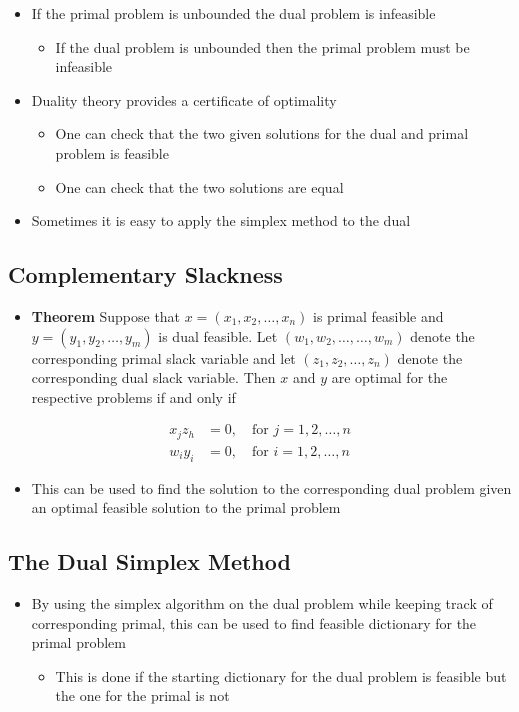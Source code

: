 \documentclass[11pt]{article}
\begin{document}
\begin{itemize}
\item If the primal problem is unbounded the dual problem is infeasible
\begin{itemize}
\item If the dual problem is unbounded then the primal problem must be infeasible
\end{itemize}

\item Duality theory provides a certificate of optimality
\begin{itemize}
\item One can check that the two given solutions for the dual and primal problem is feasible
\item One can check that the two solutions are equal
\end{itemize}

\item Sometimes it is easy to apply the simplex method to the dual
\end{itemize}

\subsection{Complementary Slackness}
\label{sec:org62afd89}
\begin{itemize}
\item \textbf{Theorem} Suppose that \(x=(x_1,x_2,\dots,x_n)\) is primal feasible and \(y=(y_1,y_2,\dots,y_m)\) is dual feasible. Let \((w_1, w_2, \dots, \dots, w_m)\) denote the corresponding primal slack variable and let \((z_1, z_2, \dots, z_n)\) denote the corresponding dual slack variable. Then \(x\) and \(y\) are optimal for the respective problems if and only if
\end{itemize}
\begin{align}
  x_jz_h &= 0, \quad \text{for } j=1, 2, \dots,n \\
  w_iy_i &= 0, \quad \text{for } i=1, 2, \dots,n
\end{align}
\begin{itemize}
\item This can be used to find the solution to the corresponding dual problem given an optimal feasible solution to the primal problem
\end{itemize}

\subsection{The Dual Simplex Method}
\label{sec:org0821a3a}
\begin{itemize}
\item By using the simplex algorithm on the dual problem while keeping track of corresponding primal, this can be used to find feasible dictionary for the primal problem
\begin{itemize}
\item This is done if the starting dictionary for the dual problem is feasible but the one for the primal is not
\end{itemize}
\end{itemize}
\end{document}
